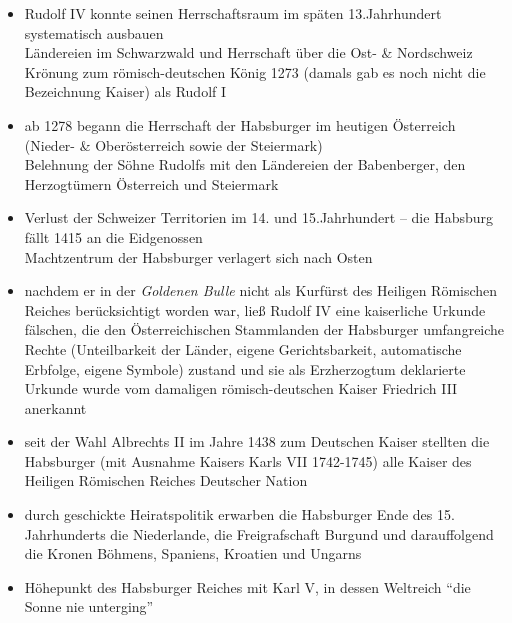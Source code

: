 \documentclass[11pt,a4paper]{article}
\begin{document}
\begin{itemize}
\item Rudolf IV konnte seinen Herrschaftsraum im späten 13.Jahrhundert systematisch ausbauen\\
 Ländereien im Schwarzwald und Herrschaft über die Ost- \& Nordschweiz\\
 Krönung zum römisch-deutschen König 1273 (damals gab es noch nicht die Bezeichnung Kaiser) als Rudolf I

\item ab 1278 begann die Herrschaft der Habsburger im heutigen Österreich (Nieder- \& Oberösterreich sowie der Steiermark)\\
 Belehnung der Söhne Rudolfs mit den Ländereien der Babenberger, den Herzogtümern Österreich und Steiermark

\item Verlust der Schweizer Territorien im 14. und 15.Jahrhundert -- die Habsburg fällt 1415 an die Eidgenossen\\
 Machtzentrum der Habsburger verlagert sich nach Osten

\item nachdem er in der \textsl{Goldenen Bulle} nicht als Kurfürst des Heiligen Römischen Reiches berücksichtigt worden war, ließ Rudolf IV eine kaiserliche Urkunde fälschen, die den Österreichischen Stammlanden der Habsburger umfangreiche Rechte (Unteilbarkeit der Länder, eigene Gerichtsbarkeit, automatische Erbfolge, eigene Symbole) zustand und sie als Erzherzogtum deklarierte\\
 Urkunde wurde vom damaligen römisch-deutschen Kaiser Friedrich III anerkannt

\item seit der Wahl Albrechts II im Jahre 1438 zum Deutschen Kaiser stellten die Habsburger (mit Ausnahme Kaisers Karls VII 1742-1745) alle Kaiser des Heiligen Römischen Reiches Deutscher Nation

\item durch geschickte Heiratspolitik erwarben die Habsburger Ende des 15. Jahrhunderts die Niederlande, die Freigrafschaft Burgund und darauffolgend die Kronen Böhmens, Spaniens, Kroatien und Ungarns

\item Höhepunkt des Habsburger Reiches mit Karl V, in dessen Weltreich "`die Sonne nie unterging"'

\end{itemize}
\end{document}
